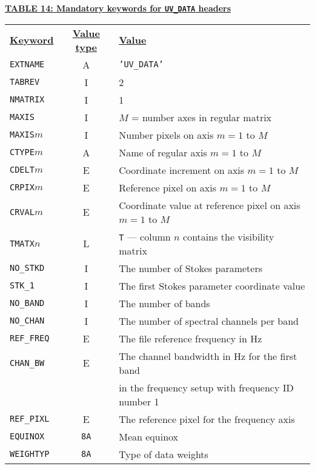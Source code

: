 \documentclass[twoside]{article}
\newcommand{\Hi}[1]{\textcolor{hicol}{#1}}
\newcommand{\Me}[1]{\textcolor{mecol}{#1}}
\begin{document}
\begin{center}
\underline{\bf{TABLE \Hi{14: Mandatory  keywords for {\tt UV\_DATA} headers}}}\\
\begin{tabular}{lcl}
\noalign{\vspace{2pt}}
\underline{{\bf Keyword}} & \underline{\bf{Value type}} &
    \underline{\bf{Value\vphantom{y}}} \\
\noalign{\vspace{2pt}} \label{ta:uvdatakeys}
{\tt EXTNAME}   & A & {\tt 'UV\_DATA'}  \\
{\tt TABREV}    & I & 2 \\
{\tt NMATRIX}   & I & 1 \\
{\tt MAXIS}     & I & \Hi{$M$ = number axes in regular matrix} \\
{\tt MAXIS}$m$  & I & \Hi{Number pixels on axis $m = 1$ to $M$} \\
{\tt CTYPE}$m$  & A & \Hi{Name of regular axis $m = 1$ to $M$} \\
{\tt CDELT}$m$  & E & \Hi{Coordinate increment on axis $m = 1$ to $M$} \\
{\tt CRPIX}$m$  & E & \Hi{Reference pixel on axis $m = 1$ to $M$} \\
{\tt CRVAL}$m$  & E & \Hi{Coordinate value at reference pixel on axis $m = 1$ to $M$} \\
{\tt TMATX}$n$  & L & \Hi{{\tt T} --- column $n$ contains the visibility matrix} \\
{\tt NO\_STKD}  & I & \Hi{The number of Stokes parameters} \\
{\tt STK\_1}    & I & \Hi{The first Stokes parameter coordinate value} \\
{\tt NO\_BAND}  & I & \Hi{The number of bands} \\
{\tt NO\_CHAN}  & I & \Hi{The number of spectral channels per band} \\
{\tt REF\_FREQ} & E & \Hi{The file reference frequency in Hz} \\
{\tt CHAN\_BW}  & E & \Hi{The channel bandwidth in Hz for the first band} \\
                &   & \Hi{in the frequency setup with frequency ID number 1} \\
{\tt REF\_PIXL} & E & \Hi{The reference pixel for the frequency axis} \\
\hline
\Me{{\tt EQUINOX}} & \Me{{\tt 8A}} & \Me{Mean equinox} \\
\Me{{\tt WEIGHTYP}} & \Me{{\tt 8A}} & \Me{Type of data weights} \\
\end{tabular}
\end{center}
\vfill\eject
\end{document}
